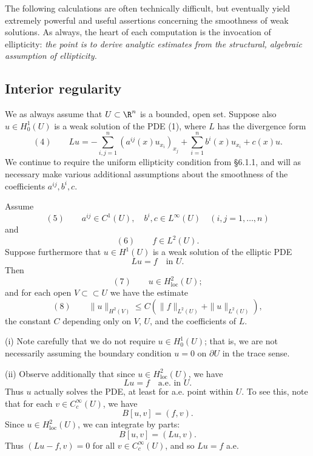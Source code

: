 The following calculations are often technically difficult, but eventually yield extremely powerful and useful assertions concerning the smoothness of weak solutions. As always, the heart of each computation is the invocation of ellipticity: \textit{the point is to derive analytic estimates from the structural, algebraic assumption of ellipticity.}

\subsection{Interior regularity}

We as always assume that $U \subset \R^n$ is a bounded, open set. Suppose also $u \in H_0^1(U)$ is a weak solution of the PDE (1), where $L$ has the divergence form
$$(4) \qquad Lu = -\sum_{i,j=1}^n \left(a^{ij}(x)u_{x_i}\right)_{x_j} + \sum_{i=1}^n b^i(x)u_{x_i} + c(x)u.$$
We continue to require the uniform ellipticity condition from \S6.1.1, and will as necessary make various additional assumptions about the smoothness of the coefficients $a^{ij}, b^i, c$.

\begin{theorem}
\label{thm:interior-h2-regularity}
Assume
$$(5) \qquad a^{ij} \in C^1(U), \quad b^i,c \in L^\infty(U) \quad (i,j=1,\ldots,n)$$
and
$$(6) \qquad f \in L^2(U).$$
Suppose furthermore that $u \in H^1(U)$ is a weak solution of the elliptic PDE
$$Lu = f \quad \text{in } U.$$
Then
$$(7) \qquad u \in H^2_{\text{loc}}(U);$$
and for each open $V \subset\subset U$ we have the estimate
$$(8) \qquad \|u\|_{H^2(V)} \leq C\left(\|f\|_{L^2(U)} + \|u\|_{L^2(U)}\right),$$
the constant $C$ depending only on $V$, $U$, and the coefficients of $L$.
\end{theorem}

\begin{remark}
\label{rem:interior-regularity-remarks}
(i) Note carefully that we do not require $u \in H_0^1(U)$; that is, we are not necessarily assuming the boundary condition $u = 0$ on $\partial U$ in the trace sense.

(ii) Observe additionally that since $u \in H^2_{\text{loc}}(U)$, we have
$$Lu = f \quad \text{a.e. in } U.$$
Thus $u$ actually solves the PDE, at least for a.e. point within $U$. To see this, note that for each $v \in C_c^\infty(U)$, we have
$$B[u,v] = (f,v).$$
Since $u \in H^2_{\text{loc}}(U)$, we can integrate by parts:
$$B[u,v] = (Lu,v).$$
Thus $(Lu-f,v) = 0$ for all $v \in C_c^\infty(U)$, and so $Lu = f$ a.e.
\end{remark}

